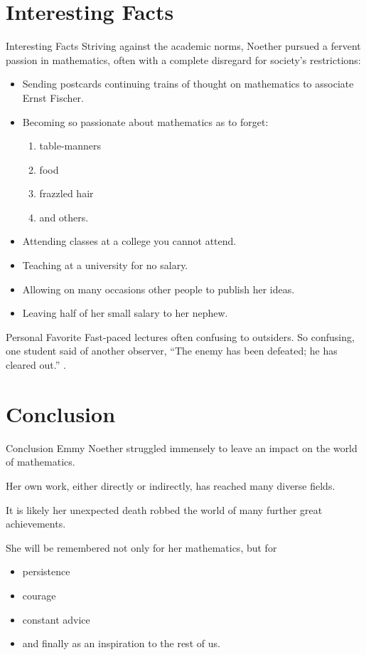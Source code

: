 \documentclass[10pt]{beamer}
\begin{document}
\section{Interesting Facts} 
\begin{frame}{Interesting Facts}
Striving against the academic norms, Noether pursued a fervent passion in
mathematics, often with a complete disregard for society's restrictions:

\begin{itemize}
    \item Sending postcards continuing trains of thought on mathematics to associate Ernst Fischer.
    \item Becoming so passionate about mathematics as to forget:
    \begin{enumerate}
        \item table-manners
        \item food
        \item frazzled hair
        \item and others.
    \end{enumerate}
    \item Attending classes at a college you cannot attend.
    \item Teaching at a university for no salary.
    \item Allowing on many occasions other people to publish her ideas.
    \item Leaving half of her small salary to her nephew.
\end{itemize}

\begin{alertblock}{Personal Favorite}
Fast-paced lectures often confusing to outsiders. So confusing, one student said of another observer, ``The enemy has been defeated; he has cleared out.'' \cite{biography}.
\end{alertblock}
\end{frame}


\section{Conclusion}
\begin{frame}{Conclusion}
Emmy Noether struggled immensely to leave an impact on the world of mathematics.

\vspace{1em}
Her own work, either directly or indirectly, has reached many diverse fields.

\vspace{1em}
It is likely her unexpected death robbed the world of many further great achievements.

\vspace{1em}
She will be remembered not only for her mathematics, but for
\begin{itemize}
\item persistence
\item courage
\item constant advice
\item and finally as an inspiration to the rest of us.
\end{itemize}
\end{frame}
\end{document}
